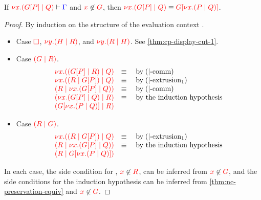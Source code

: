 \begin{lemma}\label{thm:nc-display-cut-1}
  If $\seq[{ \tm{\cpCut{x}{\cpPlug{G}{P}}{Q}} }]{ \Gamma }$ and
  $\notFreeIn{x}{G}$, then $\tm{\cpCut{x}{\cpPlug{G}{P}}{Q}} \equiv
  \tm{\cpPlug{G}{\cpCut{x}{P}{Q}}}$.
\end{lemma}
\begin{proof}
  By induction on the structure of the evaluation context .
  \begin{itemize}
  \item
    Case $\tm{\Box}$, $\tm{\cpCut{y}{H}{R}}$, and $\tm{\cpCut{y}{R}{H}}$. See \cref{thm:cp-display-cut-1}.
  \item
    Case $\tm{\ncPool{G}{R}}$.
    \[\!
      \begin{array}{ll}
        \tm{\cpCut{x}{\ncPool{\cpPlug{G}{P}}{R}}{Q}} & \equiv \quad \text{by} \; \ncEquivPoolComm \\
        \tm{\cpCut{x}{\ncPool{R}{\cpPlug{G}{P}}}{Q}} & \equiv \quad \text{by} \; \ncRedKappaPool1 \\
        \tm{\ncPool{R}{\cpCut{x}{\cpPlug{G}{P}}{Q}}} & \equiv \quad \text{by} \; \ncEquivPoolComm \\
        \tm{\ncPool{\cpCut{x}{\cpPlug{G}{P}}{Q}}{R}} & \equiv \quad \text{by the induction hypothesis}\\
        \tm{\ncPool{\cpPlug{G}{\cpCut{x}{P}{Q}}}{R}} &
      \end{array}
    \]
  \item
    Case $\tm{\ncPool{R}{G}}$.
    \[\!
      \begin{array}{ll}
        \tm{\cpCut{x}{\ncPool{R}{\cpPlug{G}{P}}}{Q}} & \equiv \quad \text{by} \; \ncRedKappaPool1 \\
        \tm{\ncPool{R}{\cpCut{x}{\cpPlug{G}{P}}{Q}}} & \equiv \quad \text{by the induction hypothesis}\\
        \tm{\ncPool{R}{\cpPlug{G}{\cpCut{x}{P}{Q}}}} &
      \end{array}
    \]
  \end{itemize}
  In each case, the side condition for , $\notFreeIn{x}{R}$, can
  be inferred from $\notFreeIn{x}{G}$, and the side conditions for the induction
  hypothesis can be inferred from \cref{thm:nc-preservation-equiv} and
  $\notFreeIn{x}{G}$.
\end{proof}
